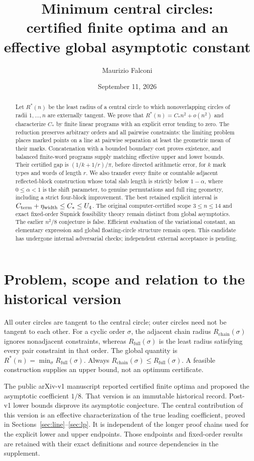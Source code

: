\documentclass[11pt]{article}
\title{Minimum central circles:\\certified finite optima and an effective global asymptotic constant}
\author{Maurizio Falconi}
\date{September 11, 2026}
\theoremstyle{definition}\newtheorem{definition}[theorem]{Definition}
\theoremstyle{remark}\newtheorem{remark}[theorem]{Remark}
\newcommand{\Rstar}{R^\ast}
\newcommand{\ch}{R_{\mathrm{chain}}}
\newcommand{\full}{R_{\mathrm{full}}}
\newcommand{\CC}{C_\ast}
\begin{document}
\maketitle
\begin{abstract}
Let $\Rstar(n)$ be the least radius of a central circle to which nonoverlapping
circles of radii $1,\ldots,n$ are externally tangent. We prove that
$\Rstar(n)=\CC n^2+o(n^2)$ and characterize $\CC$ by finite linear programs
with an explicit error tending to zero. The reduction preserves arbitrary
orders and all pairwise constraints: the limiting problem places marked
points on a line at pairwise separation at least the geometric mean of their
marks. Concatenation with a bounded boundary cost proves existence, and
balanced finite-word programs supply matching effective upper and lower
bounds. Their certified gap is $(1/k+1/r)/\pi$, before directed arithmetic
error, for $k$ mark types and words of length $r$.
We also transfer every finite or countable adjacent reflected-block
construction whose total slab length is strictly below $1-\alpha$, where
$0\le\alpha<1$ is the shift parameter, to genuine permutations and full ring
geometry, including a
strict four-block improvement. The best retained explicit interval is
$C_{\rm term}+\eta_{\rm width}\le\CC\le U_4$.
The original computer-certified scope $3\le n\le14$ and exact fixed-order
Supnick feasibility theory remain distinct from global asymptotics.
The earlier $n^2/8$ conjecture is false. Efficient evaluation of the
variational constant, an elementary expression and global floating-circle
structure remain open. This candidate has undergone internal adversarial
checks; independent external acceptance is pending.
\end{abstract}

\section{Problem, scope and relation to the historical version}

All outer circles are tangent to the central circle; outer circles need
not be tangent to each other. For a cyclic order $\sigma$, the adjacent
chain radius $\ch(\sigma)$ ignores nonadjacent constraints, whereas
$\full(\sigma)$ is the least radius satisfying every pair constraint in
that order. The global quantity is $\Rstar(n)=\min_\sigma\full(\sigma)$.
Always $\ch(\sigma)\le\full(\sigma)$. A feasible construction supplies
an upper bound, not an optimum certificate.

The public arXiv-v1 manuscript \cite{v1} reported certified finite optima
and proposed the asymptotic coefficient $1/8$. That version is an immutable
historical record. Post-v1 lower bounds disprove its asymptotic conjecture.
The central contribution of this version is an effective characterization
of the true leading coefficient, proved in Sections~\ref{sec:line}--\ref{sec:lp}.
It is independent of the longer proof chains used for the explicit lower
and upper endpoints. Those endpoints and fixed-order results are retained
with their exact definitions and source dependencies in the supplement.
\end{document}
